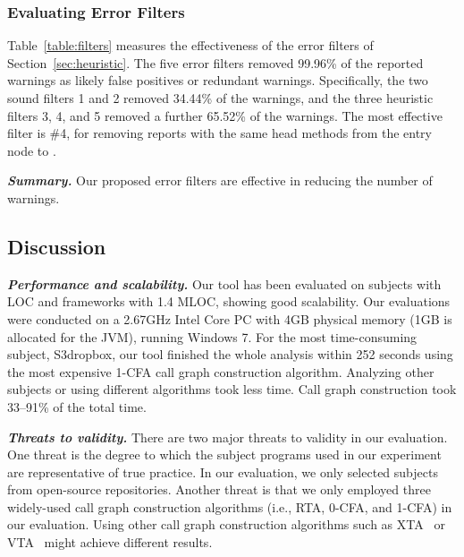 \subsubsection{Evaluating Error Filters}
\label{sec:filters}

Table~\ref{table:filters} measures the effectiveness of the
error filters of Section~\ref{sec:heuristic}.
The five error filters removed 99.96\% of the reported warnings as likely false positives
or redundant warnings. Specifically, the two sound filters 1 and 2 
removed 34.44\% of the warnings, and the three heuristic filters 3, 4, and 5
removed a further 65.52\% of the warnings. The most effective filter is
\#4, for removing reports with the same head methods from the entry node to .

\vspace{1mm}

\noindent \textbf{\textit{Summary.}} Our proposed error filters are 
effective in reducing the number of warnings.


\subsection{Discussion}

\label{sec:performance}

\noindent \textbf{\textit{Performance and scalability.}} Our tool
has been evaluated on \subnum subjects with \totaloc LOC and frameworks
with 1.4 MLOC, showing good scalability. Our evaluations
were conducted on a 2.67GHz Intel Core PC with 4GB
physical memory (1GB is allocated for the JVM), running Windows 7.
For the most time-consuming subject, S3dropbox, our tool finished the whole analysis
within 252 seconds using the most expensive 1-CFA call graph construction
algorithm. Analyzing other subjects or using different algorithms took less time.
Call graph construction took 33--91\% of the total time.


\vspace{1mm}

\noindent \textbf{\textit{Threats to validity.}}
There are two major threats to validity in our evaluation. 
One threat is the degree to which the subject programs
used in our experiment are representative of true practice.
In our evaluation, we only selected subjects from
open-source repositories. Another threat is that we only employed three
widely-used call graph construction algorithms (i.e., RTA, 0-CFA, and 1-CFA) 
in our evaluation. Using other 
call graph construction algorithms such as XTA~\cite{xta} or VTA~\cite{Sundaresan:2000} 
 might achieve different results.


